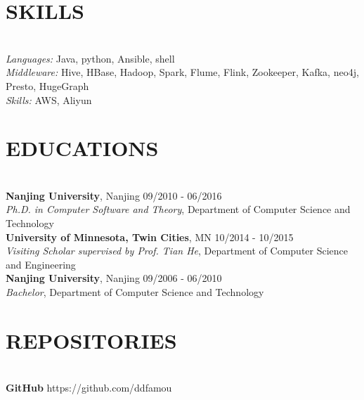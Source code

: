 \documentclass{res}
\begin{document}
\begin{resume}
\section{SKILLS}
\vspace{-10pt}
\hrulefill\\
{\sl Languages:} Java, python, Ansible, shell\\
{\sl Middleware:} Hive, HBase, Hadoop, Spark, Flume, Flink, Zookeeper, Kafka, neo4j, Presto, HugeGraph\\
{\sl Skills:} AWS, Aliyun

\section{{EDUCATIONS}}
\vspace{-10pt}
\hrulefill\\
{\bf Nanjing University}, Nanjing \hfill  09/2010 - 06/2016 \\
{\sl Ph.D. in Computer Software and Theory}, Department of Computer Science and Technology\\
{\bf University of Minnesota, Twin Cities}, MN \hfill 10/2014 - 10/2015 \\
{\sl Visiting Scholar supervised by Prof. Tian He}, Department of Computer Science and Engineering\\
{\bf Nanjing University}, Nanjing  \hfill 09/2006 - 06/2010 \\
{\sl Bachelor}, Department of  Computer Science and Technology\\

\section{{REPOSITORIES}}
\vspace{-10pt}
\hrulefill\\
{\bf GitHub} \hfill https://github.com/ddfamou

\end{resume}
\end{document}

